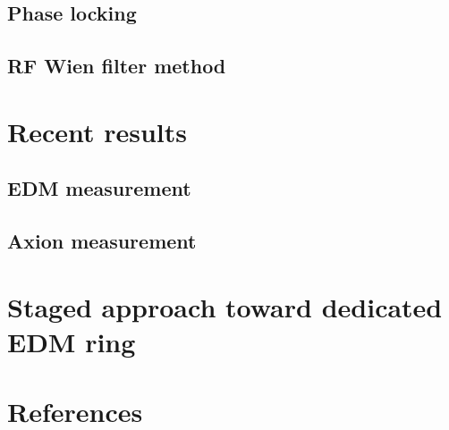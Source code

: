 \documentclass[10pt,compress,xcolor=dvipsnames]{beamer} %
\begin{document}
\subsection{Phase locking}


\subsection{RF Wien filter method}









\section{Recent results}
\subsection{EDM measurement}






\subsection{Axion measurement}







\section{Staged approach toward dedicated EDM ring }





\section*{References}












\end{document}
